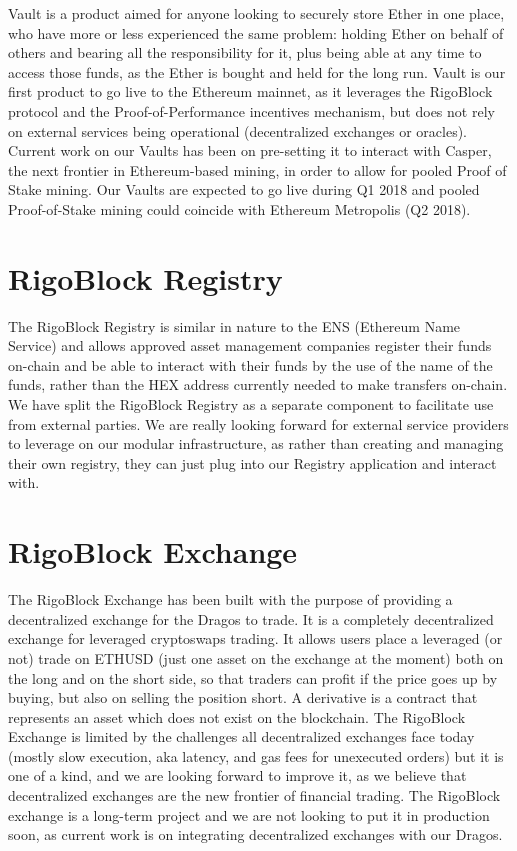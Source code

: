 \documentclass[9pt,oneside]{amsart}
\begin{document}
\begin{multicols}{2}
Vault is a product aimed for anyone looking to securely store Ether in one place, who have more or less experienced the same problem: holding Ether on behalf of others and bearing all the responsibility for it, plus being able at any time to access those funds, as the Ether is bought and held for the long run.
Vault is our first product to go live to the Ethereum mainnet, as it leverages the RigoBlock protocol and the Proof-of-Performance incentives mechanism, but does not rely on external services being operational (decentralized exchanges or oracles). Current work on our Vaults has been on pre-setting it to interact with Casper, the next frontier in Ethereum-based mining, in order to allow for pooled Proof of Stake mining. Our Vaults are expected to go live during Q1 2018 and pooled Proof-of-Stake mining could coincide with Ethereum Metropolis (Q2 2018).

\section{RigoBlock Registry}
The RigoBlock Registry is similar in nature to the ENS (Ethereum Name Service) and allows approved asset management companies register their funds on-chain and be able to interact with their funds by the use of the name of the funds, rather than the HEX address currently needed to make transfers on-chain. We have split the RigoBlock Registry as a separate component to facilitate use from external parties. We are really looking forward for external service providers to leverage on our modular infrastructure, as rather than creating and managing their own registry, they can just plug into our Registry application and interact with.

\section{RigoBlock Exchange}
The RigoBlock Exchange has been built with the purpose of providing a decentralized exchange for the Dragos to trade. It is a completely decentralized exchange for leveraged cryptoswaps trading. It allows users place a leveraged (or not) trade on ETHUSD (just one asset on the exchange at the moment) both on the long and on the short side, so that traders can profit if the price goes up by buying, but also on selling the position short. A derivative is a contract that represents an asset which does not exist on the blockchain.
The RigoBlock Exchange is limited by the challenges all decentralized exchanges face today (mostly slow execution, aka latency, and gas fees for unexecuted orders) but it is one of a kind, and we are looking forward to improve it, as we believe that decentralized exchanges are the new frontier of financial trading. The RigoBlock exchange is a long-term project and we are not looking to put it in production soon, as current work is on integrating decentralized exchanges with our Dragos.


\end{multicols}
\end{document}
